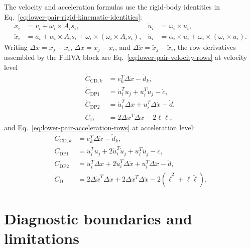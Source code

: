 \documentclass[preprint,12pt]{elsarticle}
\begin{document}
The velocity and acceleration formulas use the rigid-body identities in
Eq.~\eqref{eq:lower-pair-rigid-kinematic-identities}:
\begin{align}
  \dot x_i &= v_i+\omega_i\times A_i s_i,&
  \dot u_i &= \omega_i\times u_i,\\
  \ddot x_i &= a_i+\alpha_i\times A_i s_i+
    \omega_i\times\left(\omega_i\times A_i s_i\right),&
  \ddot u_i &= \alpha_i\times u_i+
    \omega_i\times\left(\omega_i\times u_i\right).
  \label{eq:lower-pair-rigid-kinematic-identities}
\end{align}
Writing $\Delta x=x_j-x_i$, $\Delta\dot x=\dot x_j-\dot x_i$, and
$\Delta\ddot x=\ddot x_j-\ddot x_i$, the row derivatives assembled by the
FullVA block are Eq.~\eqref{eq:lower-pair-velocity-rows} at velocity level
\begin{align}
  \dot C_{\mathrm{CD},k}
    &= e_k^T\Delta\dot x-\dot d_k,\\
  \dot C_{\mathrm{DP1}}
    &= \dot u_i^T u_j+u_i^T\dot u_j-\dot c,\\
  \dot C_{\mathrm{DP2}}
    &= \dot u_i^T\Delta x+u_i^T\Delta\dot x-\dot d,\\
  \dot C_{\mathrm{D}}
    &= 2\Delta x^T\Delta\dot x-2\ell\dot\ell,
  \label{eq:lower-pair-velocity-rows}
\end{align}
and Eq.~\eqref{eq:lower-pair-acceleration-rows} at acceleration level:
\begin{align}
  \ddot C_{\mathrm{CD},k}
    &= e_k^T\Delta\ddot x-\ddot d_k,\\
  \ddot C_{\mathrm{DP1}}
    &= \ddot u_i^T u_j+2\dot u_i^T\dot u_j+u_i^T\ddot u_j-\ddot c,\\
  \ddot C_{\mathrm{DP2}}
    &= \ddot u_i^T\Delta x+2\dot u_i^T\Delta\dot x+
       u_i^T\Delta\ddot x-\ddot d,\\
  \ddot C_{\mathrm{D}}
    &= 2\Delta\dot x^T\Delta\dot x+
       2\Delta x^T\Delta\ddot x-
       2\left(\dot\ell^2+\ell\ddot\ell\right).
  \label{eq:lower-pair-acceleration-rows}
\end{align}

\section{Diagnostic boundaries and limitations}
\end{document}
